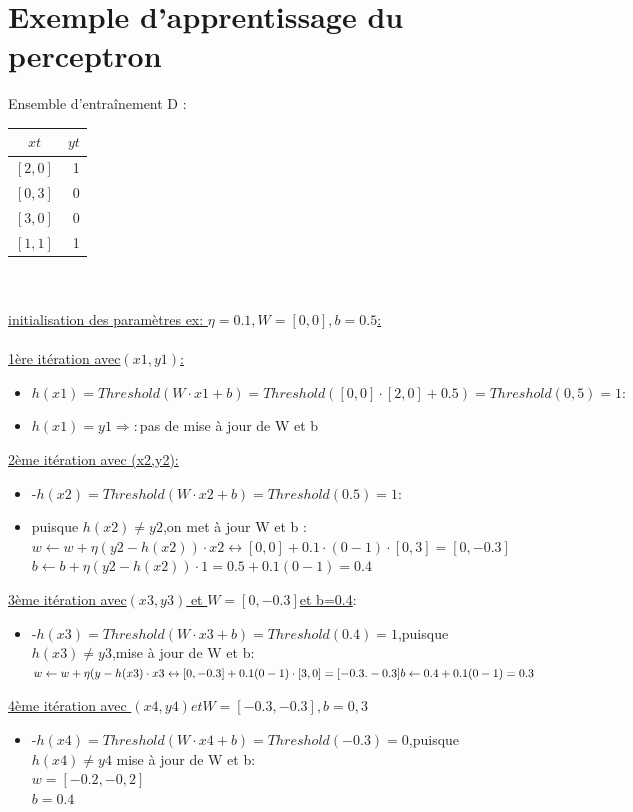 \documentclass[openany,14pt,fleqn]{book} %
\begin{document}
\section{Exemple d'apprentissage du perceptron}
Ensemble d'entraînement D\cite{Hugo_Larochelle5} :
\begin{tabular}{ c | r  }
	$ xt$& $yt $\\ \hline
   $[2,0]$& 1 \\
   $[0,3]$& 0 \\
   $[3,0]$& 0 \\
   $[1,1]$& 1 \\
 	\end{tabular}\\ \\
\underline {initialisation des paramètres ex: $\eta =0.1,W=[0,0],b=0.5$:}\\ \\
\underline {1ère itération avec$(x1,y1)$:}\break
\begin{itemize}
\item $h(x1) = Threshold(W\cdot x1+b)=Threshold([0,0]\cdot [2,0] +0.5)=Threshold(0,5)=1:$\newline
\item $h(x1) = y1\Rightarrow:$pas de mise à jour de W et b\newline
\end{itemize}
\underline {2ème itération avec (x2,y2):} \break
\begin{itemize} 
\item -$h(x2)=Threshold(W\cdot x2+b)=Threshold(0.5)=1:$\newline
\item puisque $h(x2)\neq y2$,on met à jour W et b :\\ $w\leftarrow w+\eta (y2-h(x2))\cdot x2\leftrightarrow[0,0]+0.1 \cdot(0-1)\cdot [0,3]=[0,-0.3]$\\
$b\leftarrow b+\eta(y2-h(x2))\cdot 1 =0.5+0.1(0-1)=0.4$\newline
\end{itemize}
\underline {3ème itération avec$(x3,y3)$ et $W=[0,-0.3]$et b=0.4$:$}\break
\begin{itemize}
\item -$h(x3)=Threshold(W\cdot x3+b)=Threshold(0.4)=1$,puisque $h(x3)\neq y3$,mise à jour de W et b:\newline$w\leftarrow w+\eta(y-h(x3)\cdot x3\leftrightarrow[0,-0.3]+0.1(0-1)\cdot[3,0]
=[-0.3.-0.3]\newline
b\leftarrow 0.4+0.1(0-1)=0.3$\newline
\end{itemize}
\underline{4ème itération avec $(x4,y4) et W=[-0.3,-0.3], b=0,3$}\break
\begin{itemize}
\item -$h(x4) = Threshold(W\cdot x4+b) = Threshold(-0.3)=0$,puisque $h(x4)\neq y4$ mise à jour de W et b:\\
$w = [-0.2,-0,2]$\\
$b = 0.4$
\end{itemize}
\end{document}
